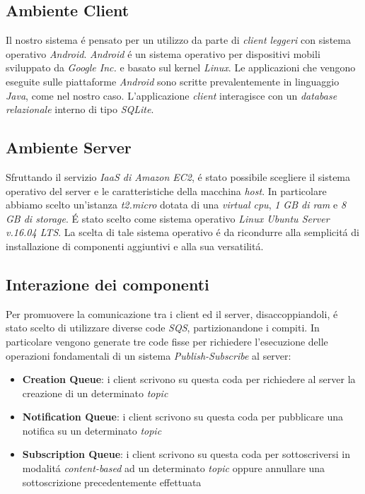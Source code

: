 \documentclass{article}
\begin{document}
\subsection{Ambiente Client}
Il nostro sistema \'e pensato per un utilizzo da parte di \textit{client leggeri} con sistema operativo \textit{Android}. \textit{Android} \'e un sistema operativo per dispositivi mobili sviluppato da \textit{Google Inc.} e basato sul kernel \textit{Linux}. Le applicazioni che vengono eseguite sulle piattaforme \textit{Android} sono scritte prevalentemente in linguaggio \textit{Java}, come nel nostro caso. L'applicazione \textit{client} interagisce con un \textit{database relazionale} interno di tipo \textit{SQLite}.

\subsection{Ambiente Server}
Sfruttando il servizio \textit{IaaS di Amazon EC2}, \'e stato possibile scegliere il sistema operativo del server e le caratteristiche della macchina \textit{host}. In particolare abbiamo scelto un'istanza \textit{t2.micro} dotata di una \textit{virtual cpu}, \textit{1 GB di ram} e \textit{8 GB di storage}. \'E stato scelto come sistema operativo \textit{Linux Ubuntu Server v.16.04 LTS}. La scelta di tale sistema operativo \'e da ricondurre alla semplicit\'a di installazione di componenti aggiuntivi e alla sua versatilit\'a.

\subsection{Interazione dei componenti}
Per promuovere la comunicazione tra i client ed il server, disaccoppiandoli, \'e stato scelto di utilizzare diverse code \textit{SQS}, partizionandone i compiti. In particolare vengono generate tre code fisse per richiedere l'esecuzione delle operazioni fondamentali di un sistema \textit{Publish-Subscribe} al  server:

\begin{itemize}
\item{\textbf{Creation Queue}: i client scrivono su questa coda per richiedere al server la creazione di un determinato \textit{topic}}
\item{\textbf{Notification Queue}: i client scrivono su questa coda per pubblicare una notifica su un determinato \textit{topic}}
\item{\textbf{Subscription Queue}: i client scrivono su questa coda per sottoscriversi in modalit\'a \textit{content-based} ad un determinato \textit{topic} oppure annullare una sottoscrizione precedentemente effettuata}
\end{itemize}
\end{document}
